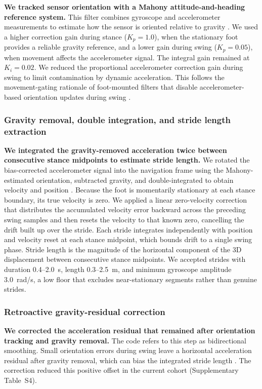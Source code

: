\documentclass[11pt]{article}
\begin{document}
\textbf{We tracked sensor orientation with a Mahony attitude-and-heading reference system.} This filter combines gyroscope and accelerometer measurements to estimate how the sensor is oriented relative to gravity \citep{Mahony2008}. We used a higher correction gain during stance ($K_p = 1.0$), when the stationary foot provides a reliable gravity reference, and a lower gain during swing ($K_p = 0.05$), when movement affects the accelerometer signal. The integral gain remained at $K_i = 0.02$. We reduced the proportional accelerometer correction gain during swing to limit contamination by dynamic acceleration. This follows the movement-gating rationale of foot-mounted filters that disable accelerometer-based orientation updates during swing \citep{Hannink2017}.

\subsubsection{Gravity removal, double integration, and stride length extraction}

\textbf{We integrated the gravity-removed acceleration twice between consecutive stance midpoints to estimate stride length.} We rotated the bias-corrected accelerometer signal into the navigation frame using the Mahony-estimated orientation, subtracted gravity, and double-integrated to obtain velocity and position \citep{Foxlin2005}. Because the foot is momentarily stationary at each stance boundary, its true velocity is zero. We applied a linear zero-velocity correction that distributes the accumulated velocity error backward across the preceding swing samples and then resets the velocity to that known zero, cancelling the drift built up over the stride. Each stride integrates independently with position and velocity reset at each stance midpoint, which bounds drift to a single swing phase. Stride length is the magnitude of the horizontal component of the 3D displacement between consecutive stance midpoints. We accepted strides with duration 0.4--2.0~s, length 0.3--2.5~m, and minimum gyroscope amplitude 3.0~rad/s, a low floor that excludes near-stationary segments rather than genuine strides.

\subsubsection{Retroactive gravity-residual correction}

\textbf{We corrected the acceleration residual that remained after orientation tracking and gravity removal.} The code refers to this step as bidirectional smoothing. Small orientation errors during swing leave a horizontal acceleration residual after gravity removal, which can bias the integrated stride length \citep{Foxlin2005, Hannink2017}. The correction reduced this positive offset in the current cohort (Supplementary Table~S4).
\end{document}
